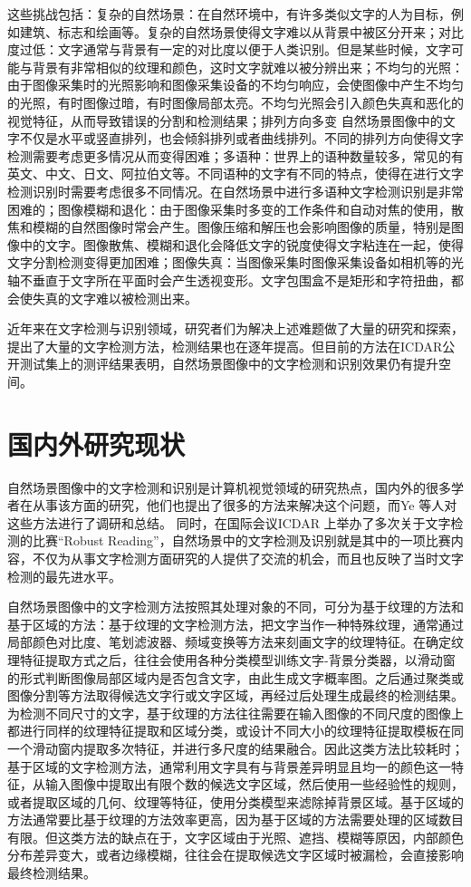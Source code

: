     这些挑战包括：复杂的自然场景：在自然环境中，有许多类似文字的人为目标，例如建筑、标志和绘画等。复杂的自然场景使得文字难以从背景中被区分开来；对比度过低：文字通常与背景有一定的对比度以便于人类识别。但是某些时候，文字可能与背景有非常相似的纹理和颜色，这时文字就难以被分辨出来；不均匀的光照：由于图像采集时的光照影响和图像采集设备的不均匀响应，会使图像中产生不均匀的光照，有时图像过暗，有时图像局部太亮。不均匀光照会引入颜色失真和恶化的视觉特征，从而导致错误的分割和检测结果；排列方向多变 自然场景图像中的文字不仅是水平或竖直排列，也会倾斜排列或者曲线排列。不同的排列方向使得文字检测需要考虑更多情况从而变得困难；多语种：世界上的语种数量较多，常见的有英文、中文、日文、阿拉伯文等。不同语种的文字有不同的特点，使得在进行文字检测识别时需要考虑很多不同情况。在自然场景中进行多语种文字检测识别是非常困难的；图像模糊和退化：由于图像采集时多变的工作条件和自动对焦的使用，散焦和模糊的自然图像时常会产生。图像压缩和解压也会影响图像的质量，特别是图像中的文字。图像散焦、模糊和退化会降低文字的锐度使得文字粘连在一起，使得文字分割检测变得更加困难；图像失真：当图像采集时图像采集设备如相机等的光轴不垂直于文字所在平面时会产生透视变形。文字包围盒不是矩形和字符扭曲，都会使失真的文字难以被检测出来。

    近年来在文字检测与识别领域，研究者们为解决上述难题做了大量的研究和探索，提出了大量的文字检测方法，检测结果也在逐年提高。但目前的方法在ICDAR公开测试集上的测评结果表明，自然场景图像中的文字检测和识别效果仍有提升空间。

    \section{国内外研究现状}
    
    自然场景图像中的文字检测和识别是计算机视觉领域的研究热点，国内外的很多学者在从事该方面的研究，他们也提出了很多的方法来解决这个问题，而Ye 等人\cite{Ye2015Text}对这些方法进行了调研和总结。 同时，在国际会议ICDAR 上举办了多次关于文字检测的比赛“Robust Reading”\cite{Karatzas2013ICDAR}，自然场景中的文字检测及识别就是其中的一项比赛内容，不仅为从事文字检测方面研究的人提供了交流的机会，而且也反映了当时文字检测的最先进水平。
    
    自然场景图像中的文字检测方法按照其处理对象的不同，可分为基于纹理的方法和基于区域的方法：基于纹理的文字检测方法，把文字当作一种特殊纹理，通常通过局部颜色对比度、笔划滤波器、频域变换等方法来刻画文字的纹理特征。在确定纹理特征提取方式之后，往往会使用各种分类模型训练文字-背景分类器，以滑动窗的形式判断图像局部区域内是否包含文字，由此生成文字概率图。之后通过聚类或图像分割等方法取得候选文字行或文字区域，再经过后处理生成最终的检测结果。为检测不同尺寸的文字，基于纹理的方法往往需要在输入图像的不同尺度的图像上都进行同样的纹理特征提取和区域分类，或设计不同大小的纹理特征提取模板在同一个滑动窗内提取多次特征，并进行多尺度的结果融合。因此这类方法比较耗时；基于区域的文字检测方法，通常利用文字具有与背景差异明显且均一的颜色这一特征，从输入图像中提取出有限个数的候选文字区域，然后使用一些经验性的规则，或者提取区域的几何、纹理等特征，使用分类模型来滤除掉背景区域。基于区域的方法通常要比基于纹理的方法效率更高，因为基于区域的方法需要处理的区域数目有限。但这类方法的缺点在于，文字区域由于光照、遮挡、模糊等原因，内部颜色分布差异变大，或者边缘模糊，往往会在提取候选文字区域时被漏检，会直接影响最终检测结果。
    
